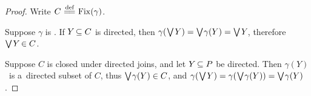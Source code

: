 \documentclass[11pt,letterpaper]{article}
\renewcommand{\thmskip}{\bigskip}
\renewcommand{\interskip}{\medskip}
\begin{document}
\interskip

\begin{proof}
Write $C\mathrel{\overset{\text{def}}{\mspace{1mu}=\!=\mspace{1mu}}}\mathop{\smash{\mathrm{Fix}}}\nolimits(\gamma)$.

Suppose $\gamma$ is \Scottcont.
If $Y\mspace{-2mu}\subseteq C$ is directed,
then $\gamma(\mspace{1mu}\mathop{\textstyle\bigvee}\nolimits\mspace{-1mu} Y)
	= \mathop{\textstyle\bigvee}\nolimits\mspace{-2mu}\gamma(Y)
	=\mathop{\textstyle\bigvee}\nolimits\mspace{-1mu} Y\mspace{-2mu}$,
therefore $\mathop{\textstyle\bigvee}\nolimits\mspace{-1mu} Y\mspace{-2mu}\in C$.

Suppose $C$ is closed under directed joins,
and let $Y\mspace{-2mu}\subseteq P$ be directed.
Then $\gamma(Y)$~is a~directed subset of $C$,
thus $\mathop{\textstyle\bigvee}\nolimits\mspace{-2mu}\gamma(Y)\in C$,
and $\gamma(\mspace{1mu}\mathop{\textstyle\bigvee}\nolimits\mspace{-1mu} Y)
	= \gamma(\mspace{1mu}\mathop{\textstyle\bigvee}\nolimits\mspace{-2mu}\gamma(Y))
	= \mathop{\textstyle\bigvee}\nolimits\mspace{-2mu}\gamma(Y)$.
\end{proof}

\thmskip

\begin{comment}
Notice something?
The second part of the proof,
	proving sufficiency of the condition imposed on the fixpoint set,
uses both assumptions, namely that $P$ is a~dcpo
	and that $\gamma$ is a~closure operator (\ie,~is~ascending, increasing, and idempotent).
However, the first part, which proves necessity of the condition, uses neither assumption,
	so let us reformulate this part in full generality.
(We will survive another trivial lemma.)

\thmskip

\begin{lemma}
If\/ $P$ is a~poset and\/ $f$ is a~\Scottcont\ endofunction on\/~$P\negtinysp$,
then the fixpoint set of\/~$f$ is closed under all existing directed joins in\/~$P\negtinysp$.
\end{lemma}

\interskip

\begin{proof}
Suppose a~directed subset $Y\negdtinysp$ of $\Fix(f)$
	has a~join $\tJoin\negtinysp Y\negdtinysp$ in~$P\negtinysp$.
Since $f$ preserves existing directed joins in~$P\negtinysp$,
the $f$-image of the join of $Y\negdtinysp$ is the join of the $f$-image of the set $Y\negdtinysp$,
that is, $f(\tJoin\negtinysp Y) = \tJoin\negdtinysp f(Y)\tinysp$.
Since all elements of $Y\negdtinysp$ are fixed points of $f$, we~have $f(Y)=Y\negdtinysp$
and therefore $f(\tJoin\negtinysp Y) = \tJoin\negtinysp Y\negdtinysp \in \Fix(f)\tinysp$.
\end{proof}

\thmskip

In particular, if $g$ is a~\Scottcont\ preclosure map on a~dcpo~$P\negtinysp$,
then $\Fix(g)$~is a~closure system in~$P$
	that is closed under all directed joins in~$P\negtinysp$.

\txtskip
\end{comment}
\end{document}
